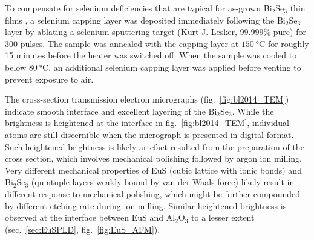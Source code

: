 To compensate for selenium deficiencies that are typical for as-grown Bi$_2$Se$_3$ thin films \cite{Zhanybek3, zhangli2012, zhangli2013, TI_ARPES1, ARPES_thickness}, a selenium capping layer was deposited immediately following the Bi$_2$Se$_3$ layer by ablating a selenium sputtering target (Kurt J. Lesker, 99.999\% pure) for 300 pulses. The sample was annealed with the capping layer at $\SI{150}{\degreeCelsius}$ for roughly 15 minutes before the heater was switched off. When the sample was cooled to below $\SI{80}{\degreeCelsius}$, an additional selenium capping layer was applied before venting to prevent exposure to air.

The cross-section transmission electron micrographs (fig.~\ref{fig:bl2014_TEM}) indicate smooth interface and excellent layering of the Bi$_2$Se$_3$. While the brightness is heightened at the interface in fig.~\ref{fig:bl2014_TEM}, individual atoms are still discernible when the micrograph is presented in digital format. Such heightened brightness is likely artefact resulted from the preparation of the cross section, which involves mechanical polishing followed by argon ion milling. Very different mechanical properties of EuS (cubic lattice with ionic bonds) and Bi$_2$Se$_3$ (quintuple layers weakly bound by van der Waals force) likely result in different response to mechanical polishing, which might be further compounded by different etching rate during ion milling. Similar heightened brightness is observed at the interface between EuS and Al$_2$O$_3$ to a lesser extent (sec.~\ref{sec:EuSPLD}, fig.~\ref{fig:EuS_AFM}).

